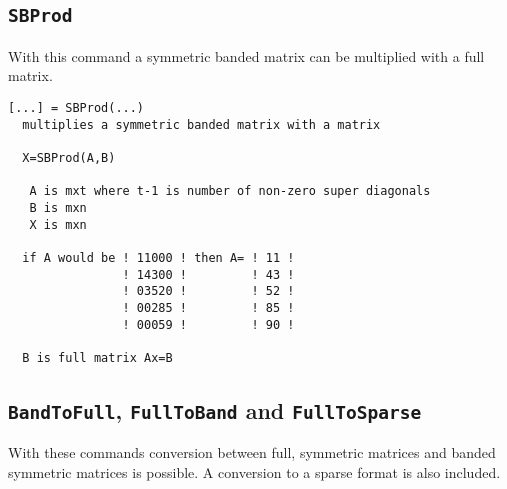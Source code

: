 \documentclass[11pt]{article}
\begin{document}
\subsection{\texttt{SBProd}}
With this command a symmetric banded matrix can be multiplied with a full
matrix.
\begin{verbatim}
[...] = SBProd(...)
  multiplies a symmetric banded matrix with a matrix

  X=SBProd(A,B)

   A is mxt where t-1 is number of non-zero super diagonals
   B is mxn
   X is mxn

  if A would be ! 11000 ! then A= ! 11 ! 
                ! 14300 !         ! 43 ! 
                ! 03520 !         ! 52 ! 
                ! 00285 !         ! 85 ! 
                ! 00059 !         ! 90 ! 

  B is full matrix Ax=B
\end{verbatim}
\subsection{\texttt{BandToFull}, \texttt{FullToBand} and \texttt{FullToSparse}}
With these commands conversion between full, symmetric matrices and banded
symmetric matrices is possible. A conversion to a sparse format is also
included.



%
%






\end{document}
